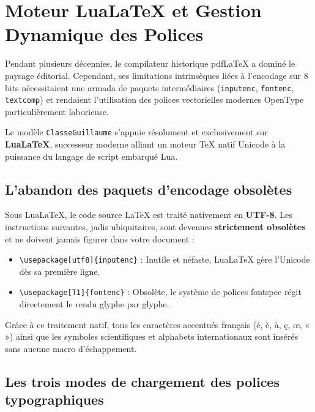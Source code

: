 \section{Moteur Lua\LaTeX{} et Gestion Dynamique des Polices}
\label{sec:lualatex_polices}

Pendant plusieurs décennies, le compilateur historique \textsf{pdf\LaTeX{}} a dominé le paysage éditorial.
Cependant, ses limitations intrinsèques liées à l'encodage sur 8 bits nécessitaient une armada de paquets intermédiaires (\texttt{inputenc}, \texttt{fontenc}, \texttt{textcomp}) et rendaient l'utilisation des polices vectorielles modernes OpenType particulièrement laborieuse.

Le modèle \texttt{ClasseGuillaume} s'appuie résolument et exclusivement sur \textbf{Lua\LaTeX{}}, successeur moderne alliant un moteur \TeX{} natif Unicode à la puissance du langage de script embarqué Lua.

\subsection{L'abandon des paquets d'encodage obsolètes}
\label{subsec:unicode_natif}

Sous Lua\LaTeX{}, le code source \LaTeX{} est traité nativement en \textbf{UTF-8}.
Les instructions suivantes, jadis ubiquitaires, sont devenues \textbf{strictement obsolètes} et ne doivent jamais figurer dans votre document :
\begin{itemize}
  \item \texttt{\textbackslash usepackage[utf8]\{inputenc\}} : Inutile et néfaste, Lua\LaTeX{} gère l'Unicode dès sa première ligne.
  \item \texttt{\textbackslash usepackage[T1]\{fontenc\}} : Obsolète, le système de polices \textsf{fontspec} régit directement le rendu glyphe par glyphe.
\end{itemize}

Grâce à ce traitement natif, tous les caractères accentués français (é, è, à, ç, œ, « ») ainsi que les symboles scientifiques et alphabets internationaux sont insérés sans aucune macro d'échappement.

\subsection{Les trois modes de chargement des polices typographiques}
\label{subsec:trois_modes_polices}

